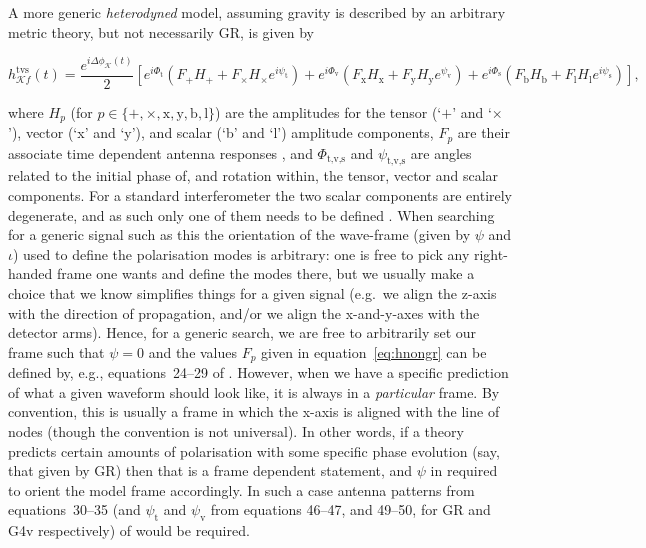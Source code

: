 A more generic {\it heterodyned} model, assuming gravity is described by an arbitrary metric theory, but not necessarily GR, is given by
\citep[see, e.g.][]{2015PhRvD..91h2002I,MaxCWpolariations}
\begin{widetext}
 \begin{equation}\label{eq:hnongr}
    h_{\mathcal{K}f}^{\text{tvs}}(t) =  \frac{e^{i\Delta\phi_{\mathcal{K}}(t)}}{2}\left[ e^{i\Phi_{\text{t}}}\left(F_+H_+ + F_{\times}H_{\times}e^{i\psi_{\text{t}}}\right)
    + e^{i\Phi_{\text{v}}}\left(F_{\text{x}}H_{\text{x}} + F_{\text{y}}H_{\text{y}}e^{\psi_{\text{v}}}\right) + e^{i\Phi_{\text{s}}}\left(F_{\text{b}}H_{\text{b}} + F_{\text{l}}H_{\text{l}}e^{i\psi_{\text{s}}} \right)\right],
 \end{equation}
\end{widetext}
where $H_{p}$ (for $p \in \{+,\times,\text{x},\text{y},\text{b},\text{l}\}$) are the amplitudes for the tensor (`$+$' and `$\times$'), vector (`x' and `y'),
and scalar (`b' and `l') \gw amplitude components, $F_{p}$ are their associate time dependent antenna responses
\citep[see, e.g.][]{2009PhRvD..79h2002N,2012PhRvD..85d3005B,2015PhRvD..91h2002I}, and $\Phi_{\text{t,v,s}}$ and $\psi_{\text{t,v,s}}$ are angles related to the initial
phase of, and rotation within, the tensor, vector and scalar components. For a standard \gw interferometer the two scalar components are entirely
degenerate, and as such only one of them needs to be defined \citep[e.g., only the `b' mode is used in Equation~19 of][]{MaxCWpolariations}. 
When searching for a generic signal such as this the orientation of the wave-frame (given by $\psi$ and $\iota$) used to define the polarisation modes is arbitrary:
one is free to pick any right-handed frame one wants and define the modes there, but we usually make a choice that we know simplifies things for a given signal
(e.g.\ we align the z-axis with the direction of propagation, and/or we align the x-and-y-axes with the detector arms). Hence, for a generic search, we are free to
arbitrarily set our frame such that $\psi=0$ and the values $F_{p}$ given in equation~\ref{eq:hnongr} can be defined by, e.g., equations~24--29 of
\citet{2015PhRvD..91h2002I}. However, when we have a specific prediction of what a given waveform should look like, it is always in a {\it particular} frame. By
convention, this is usually a frame in which the x-axis is aligned with the line of nodes (though the convention is not universal). In other words, if a theory
predicts certain amounts of polarisation with some specific phase evolution (say, that given by GR) then that is a frame dependent statement, and $\psi$ in
required to orient the model frame accordingly. In such a case \citep[e.g., GR or some other theory such as G4v in][]{2015arXiv150304866M} antenna patterns from
equations~30--35 (and $\psi_{\text{t}}$ and $\psi_{\text{v}}$ from equations 46--47, and 49--50, for GR and G4v respectively) of \citet{2015PhRvD..91h2002I}
would be required.

